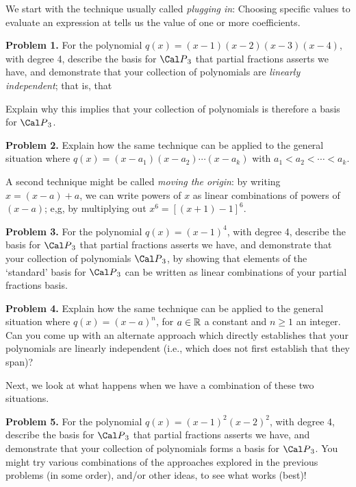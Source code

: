 \ssk

We start with the technique usually called {\it plugging in}: Choosing specific values to 
evaluate an expression at tells us the value of one or more coefficients.

\msk

{\bf Problem 1.} For the polynomial $q(x)=(x-1)(x-2)(x-3)(x-4)$, with degree 4, describe the basis for 
${\Cal P}_{3}$ that partial fractions asserts we have, and demonstrate that your collection of polynomials
are {\it linearly independent}; that is, that 


\nidt Explain why this implies that your collection of polynomials is therefore
a basis for ${\Cal P}_{3}$. 

\msk

{\bf Problem 2.} Explain how the same technique can be applied to the general situation where
$q(x)=(x-a_1)(x-a_2)\cdots(x-a_k)$ with $a_1<a_2<\cdots <a_k$.

\bsk

A second technique might be called {\it moving the origin}: by writing $x=(x-a)+a$, we can write powers of $x$
as linear combinations of powers of $(x-a)$; e,g, by multiplying out $x^6=[(x+1)-1]^6$.

\msk

{\bf Problem 3.} For the polynomial $q(x)=(x-1)^4$, with degree 4, describe the basis for 
${\Cal P}_{3}$ that partial fractions asserts we have, and demonstrate that your collection of polynomials
 ${\Cal P}_{3}$, by showing that elements of the `standard' basis for ${\Cal P}_{3}$ can be written
as linear combinations of your partial fractions basis. 

\msk

{\bf Problem 4.} Explain how the same technique can be applied to the general situation where
$q(x)=(x-a)^n$, for $a\in{\Bbb R}$ a constant and $n\geq 1$ an integer. Can you come up with an 
alternate approach which directly establishes that your polynomials are linearly independent (i.e., 
which does not first establish that they span)?

\bsk

Next, we look at what happens when we have a combination of these two situations. 

\msk

{\bf Problem 5.} For the polynomial $q(x)=(x-1)^2(x-2)^2$, with degree 4, describe the basis for 
${\Cal P}_{3}$ that partial fractions asserts we have, and demonstrate that your collection of polynomials
forms a basis for ${\Cal P}_{3}$. You might try various combinations of the approaches explored
in the previous problems (in some order), and/or other ideas, to see what works (best)!

